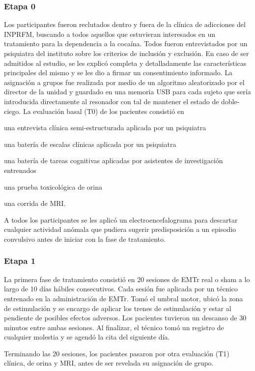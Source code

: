 \subsubsection{Etapa 0}
Los participantes fueron reclutados dentro y fuera de la clínica de adicciones del INPRFM, buscando a todos aquellos que estuvieran interesados en un tratamiento para la dependencia a la cocaína.
Todos fueron entrevistados por un psiquiatra del instituto sobre los criterios de inclusión y exclusión.
En caso de ser admitidos al estudio, se les explicó completa y detalladamente las características principales del mismo y se les dio a firmar un consentimiento informado.
La asignación a grupos fue realizada por medio de un algoritmo aleatorizado por el director de la unidad y guardado en una memoria USB para cada sujeto que sería introducida directamente al resonador con tal de mantener el estado de doble-ciego.
La evaluación basal (T0) de los pacientes consistió en
\begin{enumerate*}[label=\emph{\alph*}), before=\unskip{: }, itemjoin={{; }}, itemjoin*={{, y }}]
    \item una entrevista clínica semi-estructurada aplicada por un psiquiatra
    \item una batería de escalas clínicas aplicada por un psiquiatra
    \item una batería de tareas cognitivas aplicadas por asistentes de investigación entrenados
    \item una prueba toxicológica de orina
    \item una corrida de MRI.
\end{enumerate*}
A todos los participantes se les aplicó un electroencefalograma para descartar cualquier actividad anómala que pudiera sugerir predisposición a un episodio convulsivo antes de iniciar con la fase de tratamiento.

\subsubsection{Etapa 1}
La primera fase de tratamiento consistió en 20 sesiones de EMTr real o sham a lo largo de 10 días hábiles consecutivos. Cada sesión fue aplicada por un técnico entrenado en la administración de EMTr. Tomó el umbral motor, ubicó la zona de estimulación y se encargo de aplicar los trenes de estimulación y estar al pendiente de posibles efectos adversos.
Los pacientes tuvieron un descanso de 30 minutos entre ambas sesiones.
Al finalizar, el técnico tomó un registro de cualquier molestia y se agendó la cita del siguiente día.\par
Terminando las 20 sesiones, los pacientes pasaron por otra evaluación (T1) clínica, de orina y MRI, antes de ser revelada su asignación de grupo.

